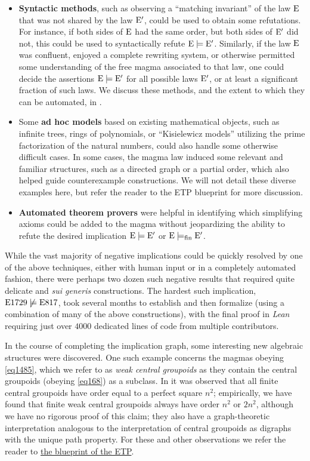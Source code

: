 \begin{itemize}
        \item \textbf{Syntactic methods}, such as observing a ``matching invariant'' of the law $\mathrm{E}$ that was not shared by the law ${\mathrm{E}'}$, could be used to obtain some refutations.  For instance, if both sides of $\mathrm{E}$ had the same order, but both sides of ${\mathrm{E}'}$ did not, this could be used to syntactically refute ${\mathrm{E}} \models {\mathrm{E}'}$.  Similarly, if the law $\mathrm{E}$ was confluent, enjoyed a complete rewriting system, or otherwise permitted some understanding of the free magma associated to that law, one could decide the assertions ${\mathrm{E}} \models {\mathrm{E}'}$ for all possible laws ${\mathrm{E}'}$, or at least a significant fraction of such laws.  We discuss these methods, and the extent to which they can be automated, in .
        \item Some \textbf{ad hoc models} based on existing mathematical objects, such as infinite trees, rings of polynomials, or ``Kisielewicz models'' utilizing the prime factorization of the natural numbers, could also handle some otherwise difficult cases.  In some cases, the magma law induced some relevant and familiar structures, such as a directed graph or a partial order, which also helped guide counterexample constructions. We will not detail these diverse examples here, but refer the reader to the ETP blueprint for more discussion.
        \item \textbf{Automated theorem provers} were helpful in identifying which simplifying axioms could be added to the magma without jeopardizing the ability to refute the desired implication ${\mathrm{E}} \models {\mathrm{E}'}$ or ${\mathrm{E}} \models_{\mathrm{fin}} {\mathrm{E}'}$.
\end{itemize}

While the vast majority of negative implications could be quickly resolved by one of the above techniques, either with human input or in a completely automated fashion, there were perhaps two dozen such negative results that required quite delicate and \emph{sui generis} constructions.  The hardest such implication, $\mathrm{E}1729 \not\models \mathrm{E}817$, took several months to establish and then formalize (using a combination of many of the above constructions), with the final proof in \emph{Lean} requiring just over $\num{4000}$ dedicated lines of code from multiple contributors.

In the course of completing the implication graph, some interesting new algebraic structures were discovered.  One such example concerns the magmas obeying \eqref{eq1485}, which we refer to as \emph{weak central groupoids} as they contain the central groupoids (obeying \eqref{eq168}) as a subclass.  In \cite{knuth} it was observed that all finite central groupoids have order equal to a perfect square $n^2$; empirically, we have found that finite weak central groupoids always have order $n^2$ or $2n^2$, although we have no rigorous proof of this claim; they also have a graph-theoretic interpretation analogous to the interpretation of central groupoids as digraphs with the unique path property.  For these and other observations we refer the reader to \href{https://teorth.github.io/equational_theories/blueprint/weak-central-groupoids-chapter.html}{the blueprint of the ETP}.

